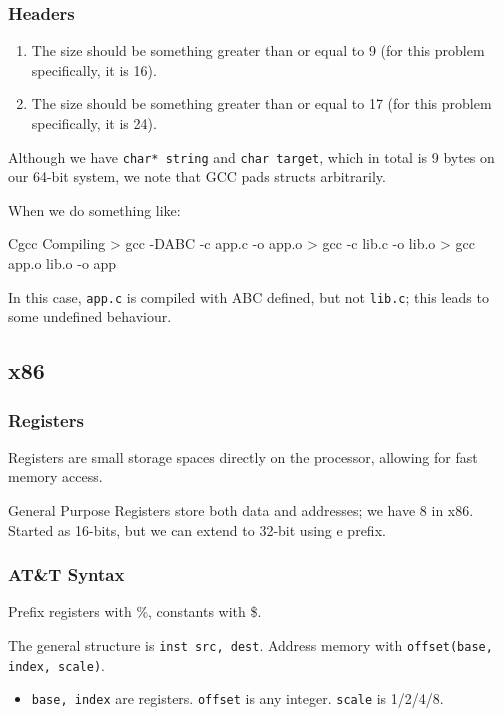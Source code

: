 \documentclass[openany]{book}
\begin{document}
\subsubsection{Headers}
\begin{enumerate}
	\item The size should be something greater than or equal to 9 (for this problem specifically, it is 16).
	\item The size should be something greater than or equal to 17 (for this problem specifically, it is 24).
\end{enumerate}
\begin{warn}
	Although we have \texttt{char* string} and \texttt{char target}, which in total is 9 bytes on our 64-bit system, we note that GCC pads structs arbitrarily.
\end{warn}

When we do something like:
\begin{code}{C}{gcc Compiling}
> gcc -DABC -c app.c -o app.o
> gcc -c lib.c -o lib.o
> gcc app.o lib.o -o app
\end{code}

In this case, \texttt{app.c} is compiled with ABC defined, but not \texttt{lib.c}; this leads to some undefined behaviour.

\subsection{x86}
\subsubsection{Registers}
Registers are small storage spaces directly on the processor, allowing for fast memory access.

General Purpose Registers store both data and addresses; we have 8 in x86. Started as 16-bits, but we can extend to 32-bit using e prefix.

\subsubsection{AT\&T Syntax}
Prefix registers with \%, constants with \$.

The general structure is \texttt{inst src, dest}. Address memory with \texttt{offset(base, index, scale)}.
\begin{itemize}
	\item \texttt{base, index} are registers. \texttt{offset} is any integer. \texttt{scale} is 1/2/4/8.
\end{itemize}
\end{document}
